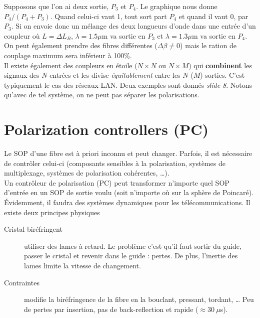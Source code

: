 Supposons que l'on ai deux sortie, $P_3$ et $P_4$. Le graphique nous donne $P_4/(P_4+P_3)$. Quand
celui-ci vaut 1, tout sort part $P_4$ et quand il vaut 0, par $P_3$. Si on envoie donc un mélange
des deux longueurs d'onde dans une entrée d'un coupleur où $L=\Delta L_B$, $\lambda=1.5\mu$m va
sortie en $P_3$ et $\lambda=1.3\mu$m va sortie en $P_4$. On peut également prendre des fibres 
différentes ($\Delta\beta\neq0$) mais le ration de couplage maximum sera inférieur à 100\%.\\

Il existe également des coupleurs en étoile ($N\times N$ ou $N\times M$) qui \textbf{combinent} 
les signaux des $N$ entrées et les divise \textit{équitablement} entre les $N$ ($M$) sorties. C'est
typiquement le cas des réseaux LAN. Deux exemples sont donnés \textit{slide 8}. Notons qu'avec de
tel système, on ne peut pas séparer les polarisations.



\section{Polarization controllers (PC)}
Le SOP d'une fibre est à priori inconnu et peut changer. Parfois, il est nécessaire de contrôler
celui-ci (composants sensibles à la polarisation, systèmes de multiplexage, systèmes de 
polarisation cohérentes, \dots). \\

Un contrôleur de polarisation (PC) peut transformer n'importe quel SOP d'entrée en un SOP de 
sortie voulu (soit n'importe où sur la sphère de Poincaré). Évidemment, il faudra des systèmes
dynamiques pour les télécommunications. Il existe deux principes physiques
\begin{description}
\item[Cristal biréfringent] utiliser des lames à retard. Le problème c'est qu'il faut sortir du
guide, passer le cristal et revenir dans le guide : pertes. De plus, l'inertie des lames limite 
la vitesse de changement.
\item[Contraintes] modifie la biréfringence de la fibre en la bouclant, pressant, tordant, \dots
Peu de pertes par insertion, pas de back-reflection et rapide ($\approx30\ \mu$s).
\end{description}

